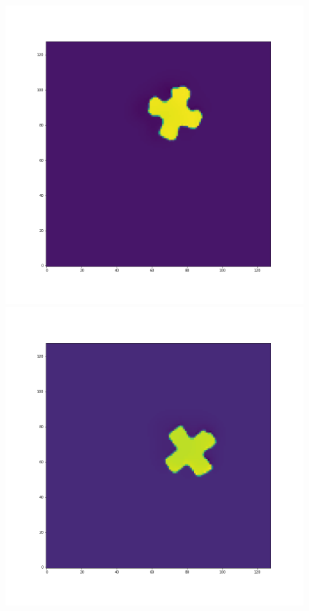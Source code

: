 \documentclass[12pt,a4paper]{article}
\begin{document}
\begin{figure}[H]
\centering
\begin{minipage}{.3\textwidth}
  \centering
  \includegraphics[width=\linewidth]{Pictures/PlusRotateTestJR/PlusRotateTest_t30.png}
\end{minipage}%
\begin{minipage}{.3\textwidth}
  \centering
  \includegraphics[width=\linewidth]{Pictures/PlusRotateTestJR/PlusRotateTest_t40.png}

\end{minipage}
\end{figure}
\end{document}

